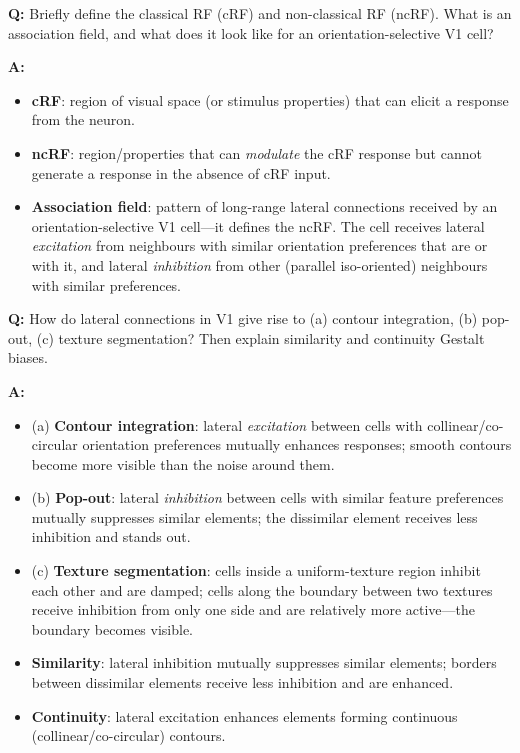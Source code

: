 \begin{exbox}
\textbf{Q:} Briefly define the classical RF (cRF) and non-classical RF (ncRF). What is an association field, and what does it look like for an orientation-selective V1 cell?

\textbf{A:}
\begin{itemize}
  \item \textbf{cRF}: region of visual space (or stimulus properties) that can elicit a response from the neuron.
  \item \textbf{ncRF}: region/properties that can \emph{modulate} the cRF response but cannot generate a response in the absence of cRF input.
  \item \textbf{Association field}: pattern of long-range lateral connections received by an orientation-selective V1 cell---it defines the ncRF. The cell receives lateral \emph{excitation} from neighbours with similar orientation preferences that are  or  with it, and lateral \emph{inhibition} from other (parallel iso-oriented) neighbours with similar preferences.
\end{itemize}
\end{exbox}

\begin{exbox}
\textbf{Q:} How do lateral connections in V1 give rise to (a) contour integration, (b) pop-out, (c) texture segmentation? Then explain similarity and continuity Gestalt biases.

\textbf{A:}
\begin{itemize}
  \item (a) \textbf{Contour integration}: lateral \emph{excitation} between cells with collinear/co-circular orientation preferences mutually enhances responses; smooth contours become more visible than the noise around them.
  \item (b) \textbf{Pop-out}: lateral \emph{inhibition} between cells with similar feature preferences mutually suppresses similar elements; the dissimilar element receives less inhibition and stands out.
  \item (c) \textbf{Texture segmentation}: cells inside a uniform-texture region inhibit each other and are damped; cells along the boundary between two textures receive inhibition from only one side and are relatively more active---the boundary becomes visible.
  \item \textbf{Similarity}: lateral inhibition mutually suppresses similar elements; borders between dissimilar elements receive less inhibition and are enhanced.
  \item \textbf{Continuity}: lateral excitation enhances elements forming continuous (collinear/co-circular) contours.
\end{itemize}
\end{exbox}

